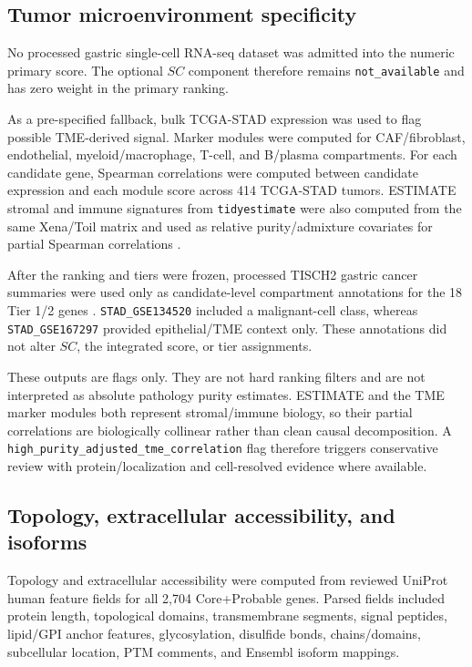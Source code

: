 \documentclass[preprint,12pt,authoryear]{elsarticle}
\begin{document}
\subsection{Tumor microenvironment specificity}

No processed gastric single-cell RNA-seq dataset was admitted into the numeric primary score. The optional $SC$ component therefore remains \texttt{not\_\allowbreak{}available} and has zero weight in the primary ranking.

As a pre-specified fallback, bulk TCGA-STAD expression was used to flag possible TME-derived signal. Marker modules were computed for CAF/\allowbreak{}fibroblast, endothelial, myeloid/\allowbreak{}macrophage, T-cell, and B/\allowbreak{}plasma compartments. For each candidate gene, Spearman correlations were computed between candidate expression and each module score across 414 TCGA-STAD tumors. ESTIMATE stromal and immune signatures from \texttt{tidyestimate} were also computed from the same Xena/\allowbreak{}Toil matrix and used as relative purity/\allowbreak{}admixture covariates for partial Spearman correlations \citep{yoshihara2013estimate}.

After the ranking and tiers were frozen, processed TISCH2 gastric cancer summaries were used only as candidate-level compartment annotations for the 18 Tier 1/\allowbreak{}2 genes \citep{han2023tisch2,zhang2019gastric_scrna,jeong2021gastric_tme}. \texttt{STAD\_\allowbreak{}GSE134520} included a malignant-cell class, whereas \texttt{STAD\_\allowbreak{}GSE167297} provided epithelial/\allowbreak{}TME context only. These annotations did not alter $SC$, the integrated score, or tier assignments.

These outputs are flags only. They are not hard ranking filters and are not interpreted as absolute pathology purity estimates. ESTIMATE and the TME marker modules both represent stromal/\allowbreak{}immune biology, so their partial correlations are biologically collinear rather than clean causal decomposition. A \texttt{high\_\allowbreak{}purity\_\allowbreak{}adjusted\_\allowbreak{}tme\_\allowbreak{}correlation} flag therefore triggers conservative review with protein/\allowbreak{}localization and cell-resolved evidence where available.

\subsection{Topology, extracellular accessibility, and isoforms}

Topology and extracellular accessibility were computed from reviewed UniProt human feature fields for all 2,704 Core+\allowbreak{}Probable genes. Parsed fields included protein length, topological domains, transmembrane segments, signal peptides, lipid/\allowbreak{}GPI anchor features, glycosylation, disulfide bonds, chains/\allowbreak{}domains, subcellular location, PTM comments, and Ensembl isoform mappings.
\end{document}
